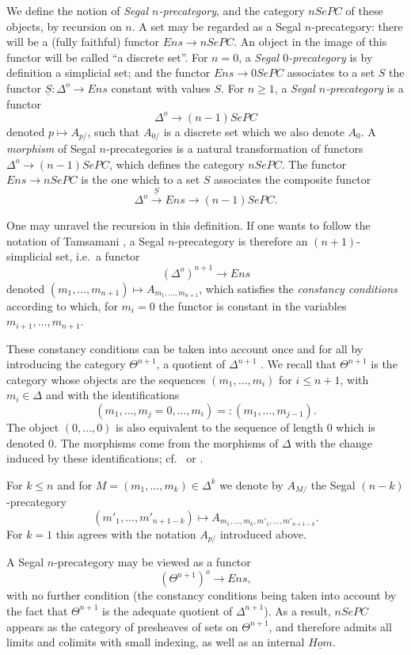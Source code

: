 We define the notion of {\em Segal $n$-precategory}, and the category $nSePC$
of these objects, by recursion on $n$. A set may be regarded as a Segal
$n$-precategory: there will be a (fully faithful) functor
$Ens\rightarrow nSePC$.
An object in the image of this functor will be called ``a discrete set''.
For $n=0$, a {\em Segal $0$-precategory} is by definition a simplicial set;
and the functor $Ens\rightarrow 0SePC$ associates to a set $S$ the functor
$\underline{S}:\Delta ^o\rightarrow Ens$ constant with values $S$. For
$n\geq 1$, a {\em Segal $n$-precategory} is a functor
$$
\Delta ^o\rightarrow (n-1)SePC
$$
denoted $p\mapsto A_{p/}$, such that $A_{0/}$ is a discrete set which we
also denote
$A_0$. A {\em morphism} of Segal $n$-precategories is a natural
transformation of functors $\Delta ^o\rightarrow (n-1)SePC$, which defines the
category $nSePC$. The functor $Ens\rightarrow nSePC$ is the one which to a
set $S$ associates the composite functor
$$
\Delta ^o\stackrel{\underline{S}}{\rightarrow} Ens \rightarrow (n-1)SePC.
$$

One may unravel the recursion in this definition. If one wants to follow the
notation of Tamsamani \cite{Tamsamani}, a Segal $n$-precategory is therefore an
$(n+1)$-simplicial set, i.e.\ a functor
$$
(\Delta ^o)^{n+1}\rightarrow Ens
$$
denoted $(m_1,\ldots , m_{n+1})\mapsto A_{m_1,\ldots , m_{n+1}}$,
which satisfies the {\em constancy conditions} according to which,
for $m_i=0$ the
functor
is constant in the variables $m_{i+1},\ldots , m_{n+1}$.

These constancy conditions can be taken into account once and for all by
introducing the category $\Theta ^{n+1}$, a quotient of $\Delta ^{n+1}$
\cite{nCAT}. We recall that $\Theta ^{n+1}$ is the category whose objects are
the sequences $(m_1,\ldots , m_i)$ for $i\leq n+1$, with $m_i\in \Delta$ and
with the identifications
$$
(m_1,\ldots , m_j=0, \ldots , m_i) =: (m_1,\ldots , m_{j-1}).
$$
The object $(0,\ldots , 0)$ is also equivalent to the sequence of length
$0$ which is denoted $0$. The morphisms come from the morphisms of
$\Delta$ with the change induced by these identifications; cf.\ \cite{nCAT}
or \cite{limits}.

For $k\leq n$ and for $M=(m_1,\ldots , m_k)\in \Delta ^k$ we denote by $A_{M/}$
the Segal $(n-k)$-precategory
$$
(m'_1,\ldots , m'_{n+1-k})\mapsto A_{m_1,\ldots , m_k, m'_1,\ldots ,
m'_{n+1-k}}.
$$
For $k=1$ this agrees with the notation $A_{p/}$ introduced above.

A Segal $n$-precategory may be viewed as a functor
$$
(\Theta ^{n+1})^o\rightarrow Ens,
$$
with no further condition (the constancy conditions being taken into account by
the fact that $\Theta ^{n+1}$ is the adequate quotient of $\Delta ^{n+1}$).
As a result, $nSePC$ appears as the category of presheaves of sets on
$\Theta ^{n+1}$, and therefore admits all limits and colimits with small
indexing, as well as an internal $\underline{Hom}$.


